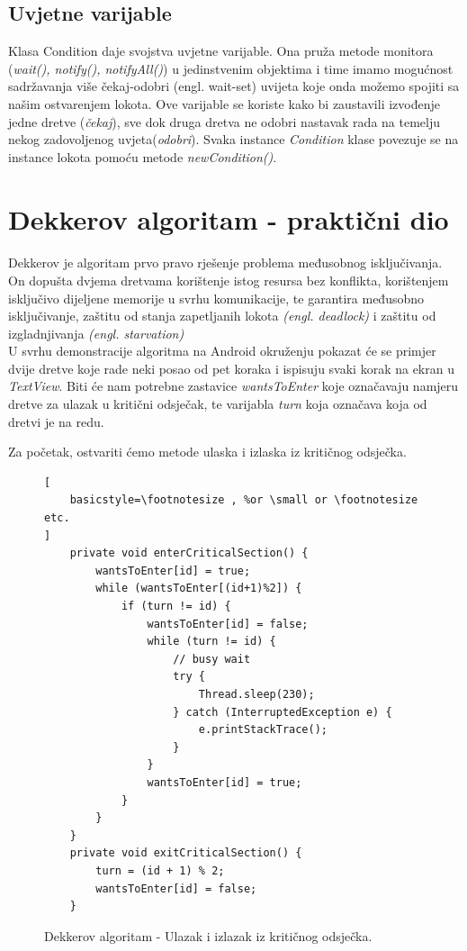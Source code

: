 \documentclass[times, utf8, zavrsni]{fer}
\begin{document}
\subsection{Uvjetne varijable}
Klasa Condition daje svojstva uvjetne varijable. Ona pruža metode monitora (\textit{wait(), notify(), notifyAll()}) u jedinstvenim objektima i time imamo mogućnost sadržavanja više čekaj-odobri (engl. wait-set) uvijeta koje onda možemo spojiti sa našim ostvarenjem lokota. 
Ove varijable se koriste kako bi zaustavili izvođenje jedne dretve (\textit{čekaj}), sve dok druga dretva ne odobri nastavak rada na temelju nekog zadovoljenog uvjeta(\textit{odobri}).
Svaka instance \textit{Condition} klase povezuje se na instance lokota pomoću metode \textit{newCondition()}.

\section{Dekkerov algoritam - praktični dio}
\paragraph{}
Dekkerov je algoritam prvo pravo rješenje problema međusobnog isključivanja. On dopušta dvjema dretvama korištenje istog resursa bez konflikta, korištenjem isključivo dijeljene memorije u svrhu komunikacije, te garantira međusobno isključivanje, zaštitu od stanja zapetljanih lokota \textit{(engl. deadlock)} i zaštitu od izgladnjivanja \textit{(engl. starvation)} \\

U svrhu demonstracije algoritma na Android okruženju pokazat će se primjer dvije dretve koje rade neki posao od pet koraka i ispisuju svaki korak na ekran u \textit{TextView}. Biti će nam potrebne zastavice \textit{wantsToEnter} koje označavaju namjeru dretve za ulazak u kritični odsječak, te varijabla \textit{turn} koja označava koja od dretvi je na redu.\newpage

Za početak, ostvariti ćemo metode ulaska i izlaska iz kritičnog odsječka.

\begin{figure}[ht!]
\begin{lstlisting}[
    basicstyle=\footnotesize , %or \small or \footnotesize etc.
]
    private void enterCriticalSection() {
        wantsToEnter[id] = true;
        while (wantsToEnter[(id+1)%2]) {
            if (turn != id) {
                wantsToEnter[id] = false;
                while (turn != id) {
                    // busy wait
                    try {
                        Thread.sleep(230);
                    } catch (InterruptedException e) {
                        e.printStackTrace();
                    }
                }
                wantsToEnter[id] = true;
            }
        }
    }
    private void exitCriticalSection() {
        turn = (id + 1) % 2;
        wantsToEnter[id] = false;
    }
\end{lstlisting}
\caption{Dekkerov algoritam - Ulazak i izlazak iz kritičnog odsječka.}
\label{overflow}
\end{figure}
\end{document}

